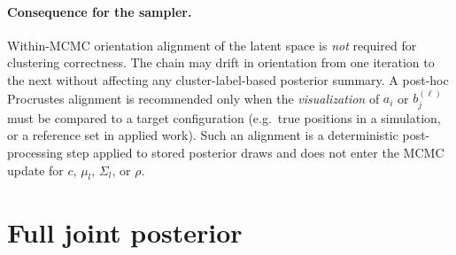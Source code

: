 \documentclass[11pt]{article}
\begin{document}
\paragraph{Consequence for the sampler.}
Within-MCMC orientation alignment of the latent space is \emph{not} required
for clustering correctness.  The chain may drift in orientation from one
iteration to the next without affecting any cluster-label-based posterior
summary.  A post-hoc Procrustes alignment is recommended only when the
\emph{visualization} of $a_i$ or $b_j^{(\ell)}$ must be compared to a target
configuration (e.g.\ true positions in a simulation, or a reference set in
applied work).  Such an alignment is a deterministic post-processing step
applied to stored posterior draws and does not enter the MCMC update for
$c$, $\mu_l$, $\Sigma_l$, or $\rho$.

\section{Full joint posterior}
\end{document}
